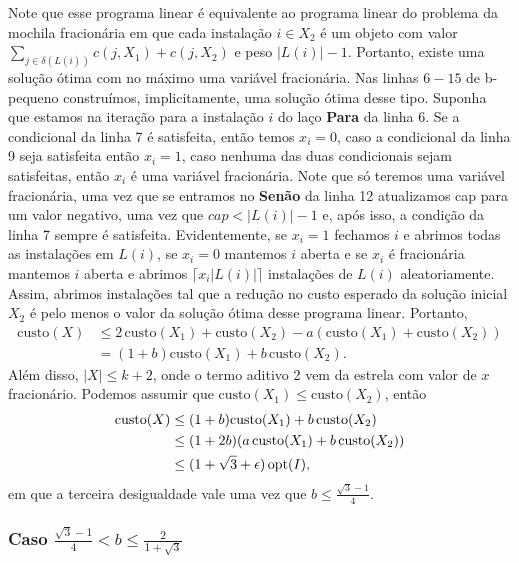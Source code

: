 Note que esse programa linear é equivalente ao programa linear do problema da mochila fracionária em que cada instalação $i \in X_2$ é um objeto com valor ${\sum_{j \in \delta(L(i))} c(j,X_1) + c(j,X_2)}$ e peso $|L(i)| - 1$. Portanto, existe uma solução ótima com no máximo uma variável fracionária. Nas linhas $6-15$ de {\sc b-pequeno} construímos, implicitamente, uma solução ótima desse tipo. Suponha que estamos na iteração para a instalação $i$ do laço {\bf Para} da linha 6. Se a condicional da linha 7 é satisfeita, então temos $x_i = 0$, caso a condicional da linha 9 seja satisfeita então $x_i = 1$, caso nenhuma das duas condicionais sejam satisfeitas, então $x_i$ é uma variável fracionária. Note que só teremos uma variável fracionária, uma vez que se entramos no {\bf Senão} da linha 12 atualizamos cap para um valor negativo, uma vez que $cap < |L(i)| - 1$ e, após isso, a condição da linha 7 sempre é satisfeita. Evidentemente, se $x_i = 1$ fechamos $i$ e abrimos todas as instalações em $L(i)$, se $x_i = 0$ mantemos $i$ aberta e se $x_i$ é fracionária mantemos $i$ aberta e abrimos $\lceil x_i |L(i)|\rceil$ instalações de $L(i)$ aleatoriamente. Assim, abrimos instalações tal que a redução no custo esperado da solução inicial $X_2$ é pelo menos o valor da solução ótima desse programa linear. Portanto, 
\begin{align}
    \text{custo}(X) &\leq 2\,\text{custo}(X_1) + \text{custo}(X_2) - a (\text{custo}(X_1) + \text{custo}(X_2)) \nonumber \\
    &= (1 + b)\text{custo}(X_1) + b\,\text{custo}(X_2). \nonumber
\end{align}
Além disso, $|X| \leq k + 2$, onde o termo aditivo 2 vem da estrela com valor de $x$ fracionário.
Podemos assumir que $\text{custo}(X_1) \leq \text{custo}(X_2)$, então
\begin{align}
    \text{custo}(X) &\leq (1+b) \text{custo}(X_1) + b\,\text{custo}(X_2) \nonumber \\
    &\leq (1+2b)(a\,\text{custo}(X_1) + b\,\text{custo}(X_2)) \nonumber \\
    &\leq (1 +\sqrt{3} + \epsilon)\,\mathrm{opt}(I), \nonumber
\end{align}
em que a terceira desigualdade vale uma vez que $b \leq \frac{\sqrt{3} - 1}{4}$.
\vspace{-0.3cm}
\subsubsection{Caso $\frac{\sqrt{3} - 1}{4} < b \leq \frac{2}{1 + \sqrt{3}}$}

